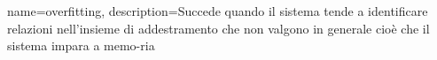 \makeglossaries

{
    name=overfitting,
    description={Succede quando il sistema tende  a identificare relazioni nell’insieme di addestramento che non valgono in generale cioè che il sistema impara a memo-ria}
}